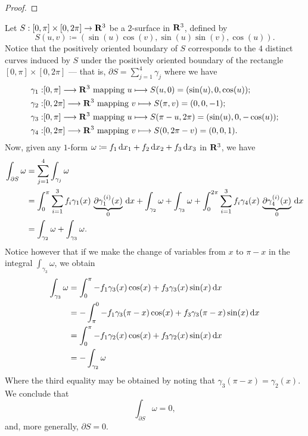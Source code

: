 \begin{proof}
\end{proof}

\begin{example}
Let \(S: [0, \pi] \times [0, 2\pi] \to \mathbf{R}^3\) be a \(2\)-surface in \(\mathbf{R}^3\),
defined by
\[
  S(u, v) \coloneq (\sin(u) \cos(v), \sin(u) \sin(v), \cos(u)).
\]
Notice that the positively oriented boundary of \(S\) corresponds to the \(4\)
distinct curves induced by \(S\) under the positively oriented boundary of the
rectangle \([0, \pi] \times [0, 2 \pi]\) --- that is, \(\partial S =
\sum_{j=1}^4 \gamma_j\) where we have
\begin{align*}
  \gamma_1:& [0, \pi] \longrightarrow \mathbf{R}^3
  \text{ mapping } u \longmapsto S(u, 0) = (\sin(u), 0, \cos(u)); \\
  \gamma_2:& [0, 2 \pi] \longrightarrow \mathbf{R}^3
  \text{ mapping } v \longmapsto S(\pi, v) = (0, 0, -1); \\
  \gamma_3:& [0, \pi]\longrightarrow \mathbf{R}^3
  \text{ mapping } u \longmapsto S(\pi - u, 2 \pi) = (\sin(u), 0, -\cos(u)); \\
  \gamma_4:& [0, 2 \pi] \longrightarrow \mathbf{R}^3
  \text{ mapping } v \longmapsto S(0, 2\pi - v) = (0, 0, 1).
\end{align*}
Now, given any \(1\)-form \(\omega \coloneq f_1\, \mathrm{d} x_1 + f_2\, \mathrm{d} x_2 +
f_3\, \mathrm{d} x_3\) in \(\mathbf{R}^3\), we have
\begin{align*}
  \int_{\partial S} \omega
  &= \sum_{j=1}^4 \int_{\gamma_j} \omega \\
  &= \int_0^{\pi} \sum_{i=1}^3
    f_i \gamma_1(x)\, \underbrace{\partial \gamma_1^{(i)}(x)}_{0}\, \mathrm{d} x
  + \int_{\gamma_2} \omega
  + \int_{\gamma_3} \omega
  + \int_0^{2 \pi} \sum_{i=1}^3
    f_i \gamma_4(x)\, \underbrace{\partial \gamma_4^{(i)}(x)}_{0}\, \mathrm{d} x \\
  &= \int_{\gamma_2} \omega + \int_{\gamma_3} \omega.
\end{align*}
Notice however that if we make the change of variables from \(x\) to \(\pi - x\)
in the integral \(\int_{\gamma_3} \omega\), we obtain
\begin{align*}
  \int_{\gamma_3} \omega
  &= \int_0^{\pi} - f_1 \gamma_3(x) \cos(x) + f_3 \gamma_3(x) \sin(x)\, \mathrm{d} x
  \\
  &= - \int_{\pi}^0 - f_1\gamma_3(\pi - x) \cos(x) + f_{3} \gamma_{3}(\pi - x)
  \sin(x)\, \mathrm{d} x
  \\
  &= \int_0^{\pi} -f_1\gamma_2(x) \cos(x) + f_3\gamma_2(x) \sin(x) \, \mathrm{d} x
  \\
  &= - \int_{\gamma_2} \omega
\end{align*}
Where the third equality may be obtained by noting that \(\gamma_3(\pi - x) =
\gamma_2(x)\). We conclude that
\[
  \int_{\partial S} \omega = 0,
\]
and, more generally, \(\partial S = 0\).
\end{example}

